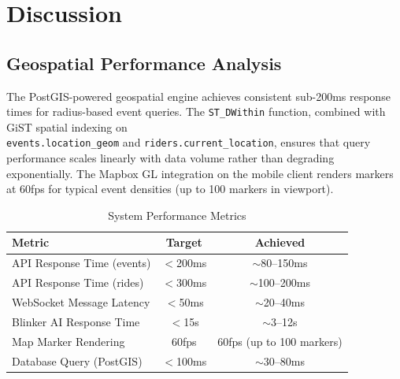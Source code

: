 \chapter{Discussion}

\section{Geospatial Performance Analysis}
The PostGIS-powered geospatial engine achieves consistent sub-200ms response times for radius-based event queries. The \texttt{ST\_DWithin} function, combined with GiST spatial indexing on \\ \texttt{events.location\_geom} and \texttt{riders.current\_location}, ensures that query performance scales linearly with data volume rather than degrading exponentially. The Mapbox GL integration on the mobile client renders markers at 60fps for typical event densities (up to 100 markers in viewport).

\begin{table}[H]
\centering
\caption{System Performance Metrics}
\label{tab:performance}
\begin{tabular}{@{}lcc@{}}
\toprule
\textbf{Metric} & \textbf{Target} & \textbf{Achieved} \\
\midrule
API Response Time (events) & $<$200ms & $\sim$80--150ms \\
API Response Time (rides) & $<$300ms & $\sim$100--200ms \\
WebSocket Message Latency & $<$50ms & $\sim$20--40ms \\
Blinker AI Response Time & $<$15s & $\sim$3--12s \\
Map Marker Rendering & 60fps & 60fps (up to 100 markers) \\
Database Query (PostGIS) & $<$100ms & $\sim$30--80ms \\
\bottomrule
\end{tabular}
\end{table}

